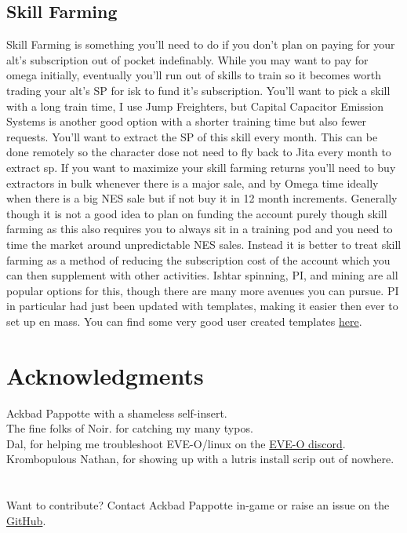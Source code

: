 \documentclass{article}
\begin{document}
\subsection{Skill Farming}
Skill Farming is something you'll need to do if you don't plan on paying for your alt's subscription out of pocket indefinably. While you may want to pay 
for omega initially, eventually you'll run out of skills to train so it becomes worth trading your alt's SP for isk to fund it's subscription. You'll want 
to pick a skill with a long train time, I use Jump Freighters, but Capital Capacitor Emission Systems is another good option with a shorter training time 
but also fewer requests. You'll want to extract the SP of this skill every month. This can be done remotely so the character dose not need to fly back to 
Jita every month to extract sp. If you want to maximize your skill farming returns you'll need to buy extractors in bulk whenever there is a major sale, 
and by Omega time ideally when there is a big NES sale but if not buy it in 12 month increments. Generally though it is not a good idea to plan on funding
the account purely though skill farming as this also requires you to always sit in a training pod and you need to time the market around unpredictable NES
sales. Instead it is better to treat skill farming as a method of reducing the subscription cost of the account which you can then supplement with other
activities. Ishtar spinning, PI, and mining are all popular options for this, though there are many more avenues you can pursue. PI in particular had just 
been updated with templates, making it easier then ever to set up en mass. You can find some very good user created templates \href{URLhttps://github.com/DalShooth/EVE_PI_Templates}{here}.

\clearpage
\section{Acknowledgments}
Ackbad Pappotte with a shameless self-insert.\\
The fine folks of Noir. for catching my many typos.\\
Dal, for helping me troubleshoot EVE-O/linux on the \href{https://discord.gg/xYt8R9AFXB}{EVE-O discord}. \\
Krombopulous Nathan, for showing up with a lutris install scrip out of nowhere. \\
\\
\\
Want to contribute? Contact Ackbad Pappotte in-game or raise an issue on the \href{https://github.com/AckbadP/eve-multi-guide}{GitHub}.  
\\
\end{document}
